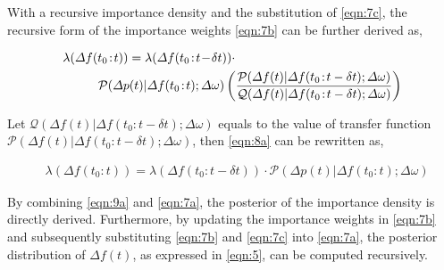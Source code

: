 \documentclass[lettersize,journal]{IEEEtran}
\newenvironment{newsubequations}{\small\begin{subequations}}{\end{subequations}}
\begin{document}
With a recursive importance density and the substitution of \eqref{eqn:7c}, the recursive form of the importance weights \eqref{eqn:7b} can be further derived as,

\vspace{-0.125in}

\begin{newsubequations}
	\begin{align}
		 & \lambda(\varDelta f(t_0\!:\!t)) = \lambda(\varDelta f(t_0\!:\!t\!-\!\delta t))\cdot \label{eqn:8a}                                                                                                                                                                        \\
		 & \qquad\,\,\,\,\, \mathcal{P}(\varDelta p(t)|\varDelta f(t_0\!:\!t);\varDelta \omega)\left(\frac{\mathcal{P}(\varDelta f(t)|\varDelta f(t_0\!:\!t-\delta t);\varDelta \omega)}{\mathcal{Q}(\varDelta f(t)|\varDelta f(t_0\!:\!t-\delta t);\varDelta \omega)}\right) \notag
	\end{align} \end{newsubequations}

Let \(\mathcal{Q}(\varDelta f(t)|\varDelta f(t_0\!:\!t\!-\!\delta t);\varDelta \omega)\) equals to the value of transfer function \(\mathcal{P}(\varDelta f(t)|\varDelta f(t_0\!:\!t\!-\!\delta t);\varDelta \omega)\), then \eqref{eqn:8a} can be rewritten as,
\vspace{-0.125in}

\begin{newsubequations}
	\begin{align}
		 & \lambda(\varDelta f(t_0\!:\!t)) = \lambda(\varDelta f(t_0\!:\!t\!-\!\delta t))\cdot \mathcal{P}(\varDelta p(t)|\varDelta f(t_0\!:\!t);\varDelta \omega)\label{eqn:9a}
	\end{align}
\end{newsubequations}

By combining \eqref{eqn:9a} and \eqref{eqn:7a}, the posterior of the importance density is directly derived. Furthermore, by updating the importance weights in \eqref{eqn:7b} and subsequently substituting \eqref{eqn:7b} and \eqref{eqn:7c} into \eqref{eqn:7a}, the posterior distribution of \(\varDelta f(t)\), as expressed in \eqref{eqn:5}, can be computed recursively.

\vspace{-0.0250in} 
\end{document}
